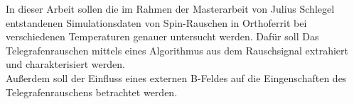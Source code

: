 \documentclass[main.tex]{subfiles}
\begin{document}
In dieser Arbeit sollen die im Rahmen der Masterarbeit von Julius Schlegel \cite{schlegel-master} entstandenen Simulationsdaten von Spin-Rauschen in Orthoferrit bei verschiedenen Temperaturen genauer untersucht werden. Dafür soll Das Telegrafenrauschen mittels eines Algorithmus aus dem Rauschsignal extrahiert und charakterisiert werden.\\
Außerdem soll der Einfluss eines externen B-Feldes auf die Eingenschaften des Telegrafenrauschens betrachtet werden.


\end{document}
